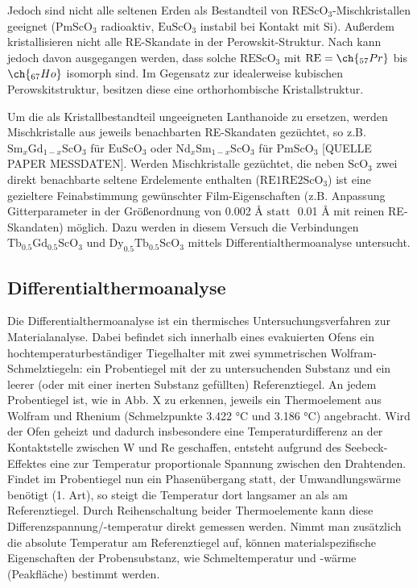 \documentclass[aps,twocolumn,secnumarabic,nobalancelastpage,amsmath,amssymb,
nofootinbib,superscriptaddress]{revtex4-1}
\begin{document}
Jedoch sind nicht alle seltenen Erden als Bestandteil von $\text{REScO}_3$-Mischkristallen geeignet ($\text{PmScO}_3$ radioaktiv, $\text{EuScO}_3$ instabil bei Kontakt mit Si).
Außerdem kristallisieren nicht alle RE-Skandate in der Perowskit-Struktur. Nach \cite{perowskHoPr} kann jedoch davon ausgegangen werden, dass solche $\text{REScO}_3$ mit
$\text{RE}=\ch{_{57}Pr}$ bis $\ch{_{67}Ho}$ isomorph sind. Im Gegensatz zur idealerweise kubischen Perowskitstruktur, besitzen diese eine orthorhombische Kristallstruktur.

Um die als Kristallbestandteil ungeeigneten Lanthanoide zu ersetzen, werden Mischkristalle aus jeweils benachbarten RE-Skandaten gezüchtet, so z.B. $\text{Sm}_x\text{Gd}_{1-x}\text{ScO}_3$
für $\text{EuScO}_3$ oder $\text{Nd}_x\text{Sm}_{1-x}\text{ScO}_3$ für $\text{PmScO}_3$ [QUELLE PAPER MESSDATEN]. Werden Mischkristalle gezüchtet, die neben $\text{ScO}_3$ zwei direkt benachbarte
seltene Erdelemente enthalten ($\text{RE1RE2ScO}_3$) ist eine gezieltere Feinabstimmung gewünschter Film-Eigenschaften (z.B. Anpassung Gitterparameter in der Größenordnung von
0.002 \AA$\text{ statt }$ 0.01 \AA$\text{ mit}$ reinen RE-Skandaten) möglich. Dazu werden in diesem Versuch die Verbindungen $\text{Tb}_{0.5}\text{Gd}_{0.5}\text{ScO}_3$
und $\text{Dy}_{0.5}\text{Tb}_{0.5}\text{ScO}_3$ mittels Differentialthermoanalyse untersucht.

\subsection{Differentialthermoanalyse}
\noindent Die Differentialthermoanalyse ist ein thermisches Untersuchungsverfahren zur Materialanalyse. Dabei befindet sich innerhalb eines evakuierten Ofens ein hochtemperaturbeständiger Tiegelhalter
mit zwei symmetrischen Wolfram-Schmelztiegeln: ein Probentiegel mit der zu untersuchenden Substanz und ein leerer (oder mit einer inerten Substanz gefüllten) Referenztiegel. An jedem Probentiegel ist,
wie in Abb. X zu erkennen, jeweils ein Thermoelement aus Wolfram und Rhenium (Schmelzpunkte 3.422 °C und 3.186 °C) angebracht. Wird der Ofen geheizt und dadurch insbesondere eine Temperaturdifferenz an
der Kontaktstelle zwischen W und Re geschaffen, entsteht aufgrund des Seebeck-Effektes eine zur Temperatur proportionale Spannung zwischen den Drahtenden. Findet im Probentiegel nun ein Phasenübergang statt,
der Umwandlungswärme benötigt (1. Art), so steigt die Temperatur dort langsamer an als am Referenztiegel. Durch Reihenschaltung beider
Thermoelemente kann diese Differenzspannung/-temperatur direkt gemessen werden. Nimmt man zusätzlich die absolute Temperatur am Referenztiegel auf, können materialspezifische Eigenschaften der Probensubstanz,
wie Schmeltemperatur und -wärme (Peakfläche) bestimmt werden.
\end{document}

